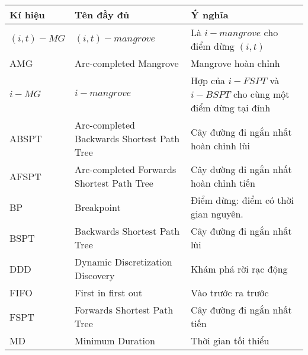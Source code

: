 \documentclass[fontsize=14pt,DIV=15pt,twoside=false]{scrbook}
\renewcommand{\arraystretch}{1.3}
\begin{document}
\begin{table}[h]
    \centering
    \small
    \renewcommand{\arraystretch}{1.1}
    \begin{tabularx}{\textwidth}{|p{1.5cm}|X|X|}
    \toprule
    \textbf{Kí hiệu} & \textbf{Tên đầy đủ}                               & \textbf{Ý nghĩa}                                                                    \\ \midrule
    \((i,t)-MG\)         & \((i,t)-mangrove\)                                & Là \(i-mangrove\) cho điểm dừng \((i, t)\)                                          \\ \midrule
    AMG              & Arc-completed Mangrove                            & Mangrove hoàn chỉnh                                                                 \\ \midrule
    \(i-MG\)             & \(i-mangrove\)                                    & Hợp của \(i-FSPT\) và \(i-BSPT\) cho cùng một điểm dừng tại đỉnh                    \\ \midrule
    ABSPT            & Arc-completed Backwards Shortest Path Tree        & Cây đường đi ngắn nhất hoàn chỉnh lùi                                               \\ \midrule
    AFSPT            & Arc-completed Forwards Shortest Path Tree         & Cây đường đi ngắn nhất hoàn chỉnh tiến                                              \\ \midrule
    BP               & Breakpoint                                        & Điểm dừng: điểm có thời gian nguyên.                                     \\ \midrule
    BSPT             & Backwards Shortest Path Tree                      & Cây đường đi ngắn nhất lùi                                                          \\ \midrule
    DDD              & Dynamic Discretization Discovery                  & Khám phá rời rạc động                                                               \\ \midrule
    FIFO             & First in first out                                & Vào trước ra trước                                                                  \\ \midrule
    FSPT             & Forwards Shortest Path Tree                       & Cây đường đi ngắn nhất tiến                                                         \\ \midrule
    MD               & Minimum Duration                                  & Thời gian tối thiểu                                                                 \\ \midrule

\end{tabularx}
\end{table}
\end{document}
